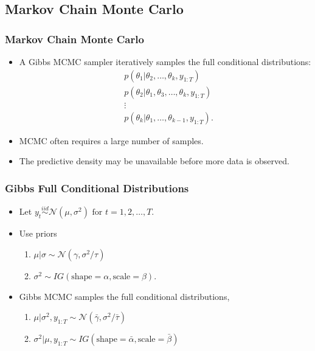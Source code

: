 \documentclass{beamer}\usepackage[]{graphicx}\usepackage[]{color}
\begin{document}
\begin{frame}
\section{Markov Chain Monte Carlo}
\frametitle{Markov Chain Monte Carlo}
\begin{itemize}
\item A Gibbs MCMC sampler iteratively samples the full conditional distributions:
\begin{align}
&p(\theta_1 | \theta_2, \dots, \theta_k, y_{1:T}) \nonumber \\
&p(\theta_2 | \theta_1, \theta_3, \dots, \theta_k, y_{1:T}) \nonumber \\
&\vdots \nonumber \\
&p(\theta_k | \theta_1, \dots, \theta_{k-1}, y_{1:T}). \nonumber
\end{align}
\item MCMC often requires a large number of samples.
\item The predictive density may be unavailable before more data is observed.
\end{itemize}
\end{frame}


\begin{frame}
\frametitle{Gibbs Full Conditional Distributions}
\begin{itemize}
\item Let $y_t \overset{iid}{\sim} \mathcal{N}\left(\mu, \sigma^2\right) \mbox{ for } t = 1, 2, \dots, T$. 
\item Use priors
\begin{enumerate}
\item $\mu | \sigma \sim \mathcal{N}\left(\gamma, \sigma^2/\tau\right)$
\item $\sigma^2 \sim IG\left(\mbox{shape} = \alpha, \mbox{scale} = \beta\right)$.
\end{enumerate}
\vspace{2mm}
\item Gibbs MCMC samples the full conditional distributions,
\begin{enumerate}
\item $\mu | \sigma^2, y_{1:T} \sim \mathcal{N}\left(\bar{\gamma}, \sigma^2 / \bar{\tau}\right)$
\item $\sigma^2 | \mu, y_{1:T} \sim IG \left(\mbox{shape} = \bar{\alpha}, \mbox{scale} = \bar{\beta} \right)$
\end{enumerate}
\end{itemize}
\end{frame}
\end{document}
